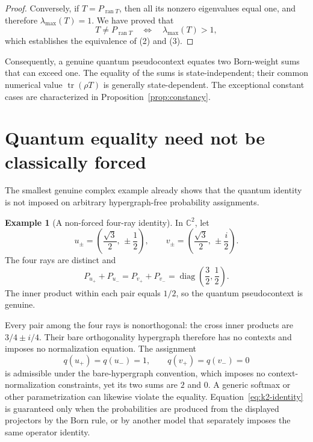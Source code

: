 \documentclass[
  twocolumn,
  aps,
  pra,
  floatfix,
  amsmath,amssymb,
  longbibliography
]{revtex4-2}
\theoremstyle{definition}
\newtheorem{example}[theorem]{Example}
\theoremstyle{remark}
\newcommand{\C}{\mathbb C}
\newcommand{\ran}{\operatorname{ran}}
\newcommand{\diag}{\operatorname{diag}}
\newcommand{\Tr}{\operatorname{tr}}
\newcommand{\1}{\mathbf 1}
\begin{document}
\begin{proof}
Conversely, if $T=P_{\ran T}$, then all its nonzero eigenvalues equal one,
and therefore $\lambda_{\max}(T)=1$.  We have proved that
\[
 T\ne P_{\ran T}
 \quad\Longleftrightarrow\quad
 \lambda_{\max}(T)>1,
\]
which establishes the equivalence of (2) and (3).
\end{proof}

Consequently, a genuine quantum pseudocontext equates two Born-weight sums
that can exceed one.  The equality of the sums is state-independent; their
common numerical value $\Tr(\rho T)$ is generally state-dependent.  The
exceptional constant cases are characterized in
Proposition~\ref{prop:constancy}.

\section{Quantum equality need not be classically forced}
\label{sec:not-forced}

The smallest genuine complex example already shows that the quantum identity
is not imposed on arbitrary hypergraph-free probability assignments.

\begin{example}[A non-forced four-ray identity]
\label{ex:k2}
In $\C^2$, let
\begin{equation}
 u_\pm=\left(\frac{\sqrt3}{2},\,\pm\frac12\right),\qquad
 v_\pm=\left(\frac{\sqrt3}{2},\,\pm\frac{i}{2}\right).
 \label{eq:k2-vectors}
\end{equation}
The four rays are distinct and
\begin{equation}
 P_{u_+}+P_{u_-}=P_{v_+}+P_{v_-}
 =\diag\left(\frac32,\frac12\right).
 \label{eq:k2-identity}
\end{equation}
The inner product within each pair equals $1/2$, so the quantum
pseudocontext is genuine.
\end{example}

Every pair among the four rays is nonorthogonal: the cross inner products are
$3/4\pm i/4$.  Their bare orthogonality hypergraph therefore has no contexts
and imposes no normalization equation.  The assignment
\begin{equation}
 q(u_+)=q(u_-)=1,\qquad q(v_+)=q(v_-)=0
 \label{eq:classical-counterexample}
\end{equation}
is admissible under the bare-hypergraph convention, which imposes no
context-normalization constraints, yet
its two sums are $2$ and $0$.  A generic softmax or other parametrization can
likewise violate the equality.  Equation~\eqref{eq:k2-identity} is guaranteed
only when the probabilities are produced from the displayed projectors by
the Born rule, or by another model that separately imposes the same operator
identity.
\end{document}
